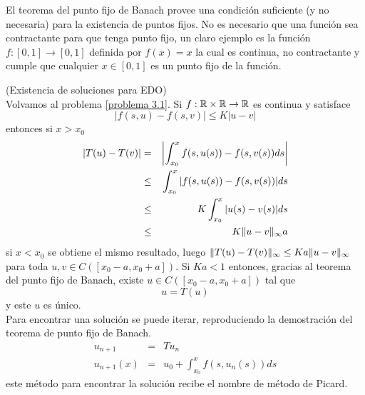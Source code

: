 \begin{nota}
El teorema del punto fijo de Banach provee una condici\'on suficiente (y no necesaria) para la existencia de puntos fijos. No es necesario que una funci\'on sea contractante para que tenga punto fijo, un claro ejemplo es la funci\'on $f:[0,1]\to [0,1]$ definida por $f(x)=x$ la cual es continua, no contractante y cumple que cualquier $x\in [0,1]$ es un punto fijo de la funci\'on.
\end{nota}

\begin{ejemplo}{\rm (Existencia de soluciones para EDO)}
\\Volvamos al problema \ref{problema 3.1}. Si $f:\mathbb{R}\times \mathbb{R}\to \mathbb{R}$ es continua y satisface
\[|f(s,u)-f(s,v)|\leq K|u-v|\]
entonces si $x>x_0$
\begin{eqnarray*}
|T(u)-T(v)| &  =  & \left|\int_{x_0}^x f(s,u(s))-f(s,v(s))ds \right| \\ 
			&\leq & \int_{x_0}^x |f(s,u(s))-f(s,v(s))|ds \\ 
			&\leq & K\int_{x_0}^x |u(s)-v(s)|ds \\ 
			&\leq & K\lVert u-v\rVert_{\infty}a 
\end{eqnarray*} 
si $x<x_0$ se obtiene el mismo resultado, luego $\lVert T(u)-T(v)\rVert_{\infty}\leq Ka\lVert u-v\rVert_{\infty}$ para toda $u,v\in C([x_0-a,x_0+a])$. Si $Ka<1$ entonces, gracias al teorema del punto fijo de Banach, existe $u\in C([x_0-a,x_0+a])$ tal que
\[u=T(u)\] 
y este $u$ es \'unico.
\\Para encontrar una soluci\'on se puede iterar, reproduciendo la demostraci\'on del teorema de punto fijo de Banach. 
\begin{eqnarray*}
u_{n+1}   &=& Tu_n \\
u_{n+1}(x)&=& u_0+\int_{x_0}^x f(s,u_n(s))ds 
\end{eqnarray*}
este m\'etodo para encontrar la soluci\'on recibe el nombre de
m\'etodo de Picard.
\end{ejemplo}

